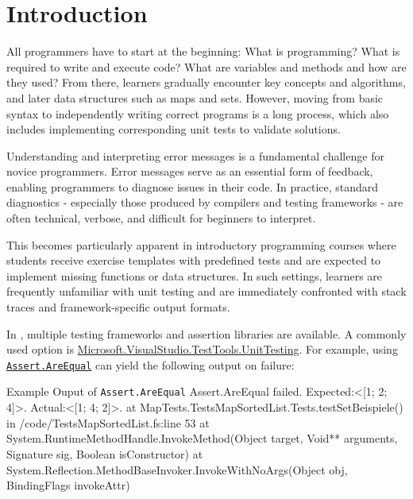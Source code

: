 \chapter{Introduction} %
  \label{Introduction} %


\improve


\begin{justify}
All programmers have to start at the beginning: What is programming? What is required to write and execute code? What are variables and methods and how are they used?
From there, learners gradually encounter key concepts and algorithms, and later data structures such as maps and sets. However, moving from basic syntax to
independently writing correct programs is a long process, which also includes implementing corresponding unit tests to validate solutions.

\skipM Understanding and interpreting error messages is a fundamental challenge for novice programmers. Error messages serve as an essential form of feedback,
enabling programmers to diagnose issues in their code. In practice, standard diagnostics - especially those produced by compilers and testing frameworks -
are often technical, verbose, and difficult for beginners to interpret.

\skipM This becomes particularly apparent in introductory programming courses where students receive exercise templates with predefined tests and
are expected to implement missing functions or data structures. In such settings, learners are frequently unfamiliar with unit testing and
are immediately confronted with stack traces and framework-specific output formats.

\skipM In \fs, multiple testing frameworks and assertion libraries are available. A commonly used option is
\href{https://learn.microsoft.com/en-us/dotnet/api/microsoft.visualstudio.testtools.unittesting}{Microsoft.VisualStudio.TestTools.UnitTesting}. For example, using
\href{https://learn.microsoft.com/en-us/dotnet/api/microsoft.visualstudio.testtools.unittesting.assert.areequal?view=mstest-net-3.8}{\texttt{Assert.AreEqual}}
can yield the following output on failure:
\begin{verbatimpanel}[error message, hl={2-3}, hlcolor=red!90]{Example Ouput of \texttt{Assert.AreEqual}}
Assert.AreEqual failed. Expected:<[1; 2; 4]>. Actual:<[1; 4; 2]>.
    at MapTests.TestsMapSortedList.Tests.testSetBeispiele() in /code/TestsMapSortedList.fs:line 53
    at System.RuntimeMethodHandle.InvokeMethod(Object target, Void** arguments, Signature sig, Boolean isConstructor)
    at System.Reflection.MethodBaseInvoker.InvokeWithNoArgs(Object obj, BindingFlags invokeAttr)
\end{verbatimpanel}


\end{justify}
